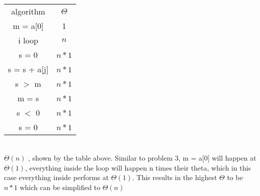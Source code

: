 \documentclass[letterpaper]{article}
\begin{document}
        \subsection{}
        	\begin{tabular}{cc}
            	algorithm & $\Theta$ \\
            	m = a[0] & 1\\
            	i loop & $n$\\
            	s = 0 & $n * 1$\\
            	s = s + a[j] & $n * 1$\\
            	s $>$ m & $n * 1$\\
                m = s & $n * 1$\\
                s $<$ 0 & $n * 1$\\
                s = 0 & $n * 1$\\
            \end{tabular}\\
            $\Theta(n)$ , shown by the table above.  Similar to problem 3, m = a[0] will happen at $\Theta(1)$, everything inside the loop will happen n times their theta, which in this case everything inside performs at $\Theta(1)$.  This results in the highest $\Theta$ to be $n * 1$ which can be simplified to $\Theta(n)$
\end{document}
